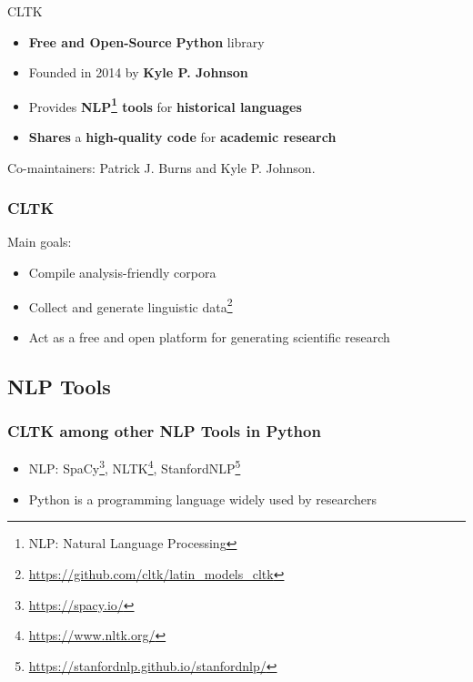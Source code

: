 \documentclass{beamer}
\begin{document}
\begin{frame}{CLTK}
\begin{itemize}
    \item \textbf{Free and Open-Source} \textbf{Python} library
    \item Founded in 2014 by \textbf{Kyle P. Johnson}
    \item Provides \textbf{NLP\footnote{NLP: Natural Language Processing} tools} for \textbf{historical languages}
    \item \textbf{Shares} a \textbf{high-quality code} for \textbf{academic research}
    
\end{itemize}
Co-maintainers: Patrick J. Burns and Kyle P. Johnson.
    
\end{frame}


\begin{frame}
\frametitle{CLTK}
Main goals:
\begin{itemize}
\item[1.] Compile analysis-friendly corpora
\item[2.] Collect and generate linguistic data\footnote{\href{https://github.com/cltk/latin_models_cltk}{https://github.com/cltk/latin\_models\_cltk}}
\item[3.] Act as a free and open platform for generating scientific research

\end{itemize}
    
\end{frame}

\subsection{NLP Tools}
\begin{frame}
\frametitle{CLTK among other NLP Tools in Python}
\begin{itemize}
    
    \item NLP: SpaCy\footnote{\href{https://spacy.io/}{https://spacy.io/}}, NLTK\footnote{\href{https://www.nltk.org/}{https://www.nltk.org/}}, StanfordNLP\footnote{\href{https://stanfordnlp.github.io/stanfordnlp/}{https://stanfordnlp.github.io/stanfordnlp/}}
    \item Python is a programming language widely used by researchers
\end{itemize}
\end{frame}
\end{document}
